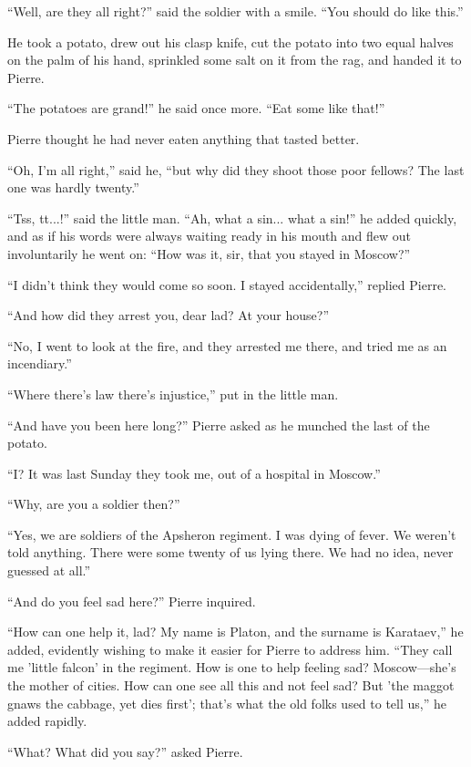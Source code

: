 ``Well, are they all right?'' said the soldier with a
smile. ``You should do like this.''

He took a potato, drew out his clasp knife, cut the potato into
two equal halves on the palm of his hand, sprinkled some salt on
it from the rag, and handed it to Pierre.

``The potatoes are grand!'' he said once more. ``Eat some like
that!''

Pierre thought he had never eaten anything that tasted better.

``Oh, I'm all right,'' said he, ``but why did they shoot those
poor fellows? The last one was hardly twenty.''

``Tss, tt...!'' said the little man. ``Ah, what a sin... what a
sin!'' he added quickly, and as if his words were always waiting
ready in his mouth and flew out involuntarily he went on: ``How
was it, sir, that you stayed in Moscow?''

``I didn't think they would come so soon. I stayed
accidentally,'' replied Pierre.

``And how did they arrest you, dear lad? At your house?''

``No, I went to look at the fire, and they arrested me there, and
tried me as an incendiary.''

``Where there's law there's injustice,'' put in the little man.

``And have you been here long?'' Pierre asked as he munched the
last of the potato.

``I? It was last Sunday they took me, out of a hospital in
Moscow.''

``Why, are you a soldier then?''

``Yes, we are soldiers of the Apsheron regiment. I was dying of
fever. We weren't told anything. There were some twenty of us
lying there. We had no idea, never guessed at all.''

``And do you feel sad here?'' Pierre inquired.

``How can one help it, lad? My name is Platon, and the surname is
Karataev,'' he added, evidently wishing to make it easier for
Pierre to address him. ``They call me 'little falcon' in the
regiment. How is one to help feeling sad? Moscow---she's the
mother of cities. How can one see all this and not feel sad? But
'the maggot gnaws the cabbage, yet dies first'; that's what the
old folks used to tell us,'' he added rapidly.

``What? What did you say?'' asked Pierre.

